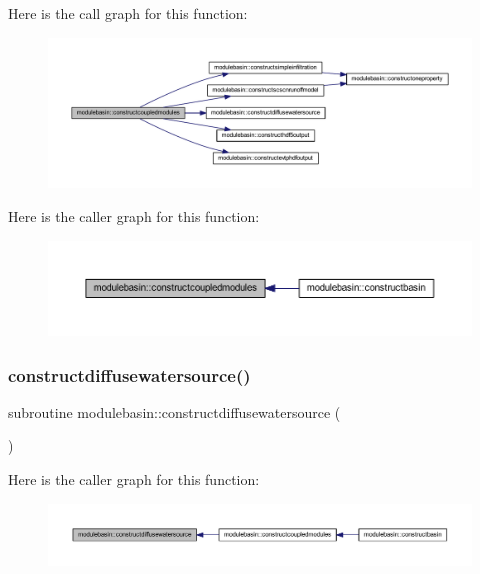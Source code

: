 Here is the call graph for this function\+:\nopagebreak
\begin{figure}[H]
\begin{center}
\leavevmode
\includegraphics[width=350pt]{namespacemodulebasin_a3b96c67f2670be0a100bc48d94ecb93d_cgraph}
\end{center}
\end{figure}
Here is the caller graph for this function\+:\nopagebreak
\begin{figure}[H]
\begin{center}
\leavevmode
\includegraphics[width=350pt]{namespacemodulebasin_a3b96c67f2670be0a100bc48d94ecb93d_icgraph}
\end{center}
\end{figure}
\mbox{\label{namespacemodulebasin_a3d6f3d514121b3b20c1b2d2ec4c56fa9}} 
\subsubsection{\texorpdfstring{constructdiffusewatersource()}{constructdiffusewatersource()}}
{\footnotesize\ttfamily subroutine modulebasin\+::constructdiffusewatersource (\begin{DoxyParamCaption}{ }\end{DoxyParamCaption})\hspace{0.3cm}{\ttfamily [private]}}

Here is the caller graph for this function\+:\nopagebreak
\begin{figure}[H]
\begin{center}
\leavevmode
\includegraphics[width=350pt]{namespacemodulebasin_a3d6f3d514121b3b20c1b2d2ec4c56fa9_icgraph}
\end{center}
\end{figure}
\mbox{\label{namespacemodulebasin_abec73ddab1c13a2f52007dbd7a5adf56}} 
